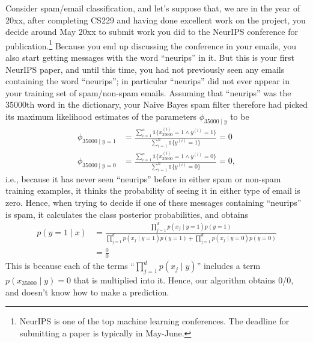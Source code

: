 Consider spam/email classification, and let's suppose that, we are in the
year of 20xx, after completing CS229 and having done excellent work on the
project, you decide around May 20xx to submit work you did to the NeurIPS
conference for publication.\footnote{NeurIPS is one of the top machine learning conferences. The deadline for submitting
a paper is typically in May-June.} Because you end up discussing the conference
in your emails, you also start getting messages with the word ``neurips''
in it. But this is your first NeurIPS paper, and until this time, you had
not previously seen any emails containing the word ``neurips''; in particular
``neurips'' did not ever appear in your training set of spam/non-spam emails.
Assuming that ``neurips'' was the 35000th word in the dictionary, your Naive
Bayes spam filter therefore had picked its maximum likelihood estimates of
the parameters $\phi_{35000 \mid y}$ to be
\begin{align}
    \phi_{35000 \mid y=1} &= \frac{\sum_{i=1}^n \mathbb{1}\{x_{35000}^{(i)} = 1 \wedge y^{(i)} = 1 \}}{\sum_{i=1}^n \mathbb{1}\{ y^{(i)} = 1 \}} = 0\\
    \phi_{35000 \mid y=0} &= \frac{\sum_{i=1}^n \mathbb{1}\{x_{35000}^{(i)} = 1 \wedge y^{(i)} = 0 \}}{\sum_{i=1}^n \mathbb{1}\{ y^{(i)} = 0 \}} = 0,
\end{align}
i.e., because it has never seen ``neurips'' before in either spam or non-spam
training examples, it thinks the probability of seeing it in either type of email
is zero. Hence, when trying to decide if one of these messages containing
``neurips'' is spam, it calculates the class posterior probabilities, and obtains
\begin{align}
    p(y = 1 \mid x) &= \frac{\prod_{j=1}^d p(x_j \mid y=1) p(y=1)}{\prod_{j=1}^d p(x_j \mid y=1) p(y=1) + \prod_{j=1}^d p(x_j \mid y=0) p(y=0)}\\
    &= \frac{0}{0}
\end{align}
This is because each of the terms ``$\prod_{j=1}^d p(x_j \mid y)$'' includes a term $p(x_{35000} \mid y) =
0$ that is multiplied into it. Hence, our algorithm obtains 0/0, and doesn't
know how to make a prediction.

